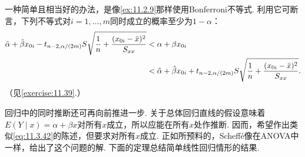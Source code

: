 一种简单且相当好的办法，是像\autoref{ex:11.2.9}那样使用Bonferroni不等式. 利用它可断言，下列不等式对$i=1,\ldots,m$同时成立的概率至少为$1-\alpha$：
\begin{equation}\label{eq:11.3.42}\index{SI0562@回归}
\begin{aligned}
\hat\alpha+\hat\beta x_{0i}-t_{n-2,\alpha/(2m)}S\sqrt{\frac1n+\frac{(x_{0i}-\bar x)^2}{S_{xx}}}
&<\alpha+\beta x_{0i}\\
&<\hat\alpha+\hat\beta x_{0i}+t_{n-2,\alpha/(2m)}S\sqrt{\frac1n+\frac{(x_{0i}-\bar x)^2}{S_{xx}}}.
\end{aligned}
\end{equation}
（见\autoref{exercise:11.39}.）

回归中的同时推断还可再向前推进一步. 关于总体回归直线的假设意味着$E(Y\mid x)=\alpha+\beta x$对所有$x$成立，所以应能在所有$x$处作推断. 因而，希望作出类似\eqref{eq:11.3.42}的陈述，但要求对所有$x$成立. 正如所预料的，Scheff\'e像在ANOVA中一样，给出了这个问题的解. 下面的定理总结简单线性回归情形的结果.

